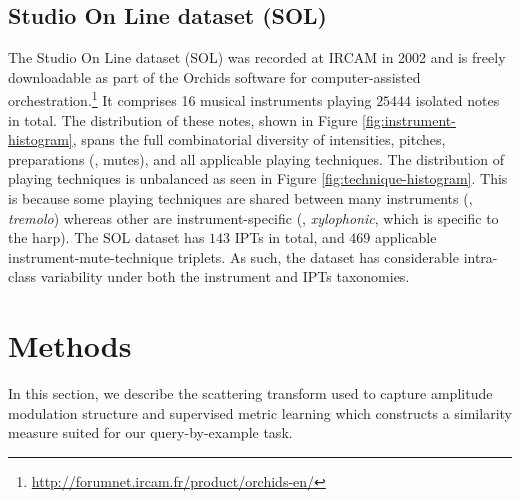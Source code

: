 \subsection{Studio On Line dataset (SOL)}
The Studio On Line dataset (SOL) was recorded at IRCAM in 2002 and is freely downloadable as part of the Orchids software for computer-assisted orchestration.\footnote{\url{http://forumnet.ircam.fr/product/orchids-en/}}
It comprises 16 musical instruments playing $25444$ isolated notes in total.
The distribution of these notes, shown in Figure \ref{fig:instrument-histogram}, spans the full combinatorial diversity of intensities, pitches, preparations (\ie{}, mutes), and all applicable playing techniques.
The distribution of playing techniques is unbalanced as seen in Figure \ref{fig:technique-histogram}.
This is because some playing techniques are shared between many instruments (\eg{}, \textit{tremolo}) whereas other are instrument-specific (\eg{}, \textit{xylophonic}, which is specific to the harp).
The SOL dataset has $143$ IPTs in total, and $469$ applicable instrument-mute-technique triplets.
As such, the dataset has considerable intra-class variability under both the instrument and IPTs taxonomies.







\section{Methods}

In this section, we describe the scattering transform used to capture amplitude modulation structure and supervised metric learning which constructs a similarity measure suited for our query-by-example task.

